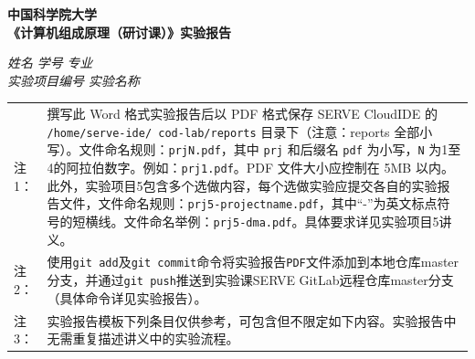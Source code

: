 \begin{center}
  \LARGE \bf 中国科学院大学 \\《计算机组成原理（研讨课）》实验报告
\end{center}

\begin{center}
  \emph{姓名} \underline{\makebox[7em][c]{\name}} 
  \emph{学号} \underline{\makebox[12em][c]{\studentNum}}
  \emph{专业} \underline{\makebox[15em][c]{\major}}\\
  \emph{实验项目编号} \underline{\makebox[3em][c]{\labNum}}
  \emph{实验名称} \underline{\makebox[30em][c]{\labName}}\\
\end{center}

\begin{center}
  \begin{tabularx}{\textwidth}{|lX|}
    \hline
    注1： & 撰写此 Word 格式实验报告后以 PDF 格式保存 SERVE CloudIDE 的 \texttt{/home/serve-ide/ cod-lab/reports} 目录下（注意：reports 全部小写）。文件命名规则：\texttt{prjN.pdf}，其中 \texttt{prj} 和后缀名 \texttt{pdf} 为小写，\texttt{N} 为1至4的阿拉伯数字。例如：\texttt{prj1.pdf}。PDF 文件大小应控制在 5MB 以内。此外，实验项目5包含多个选做内容，每个选做实验应提交各自的实验报告文件，文件命名规则：\texttt{prj5-projectname.pdf}，其中``-''为英文标点符号的短横线。文件命名举例：\texttt{prj5-dma.pdf}。具体要求详见实验项目5讲义。 \\

    注2： & 使用\texttt{git add}及\texttt{git commit}命令将实验报告\texttt{PDF}文件添加到本地仓库master分支，并通过\texttt{git push}推送到实验课SERVE GitLab远程仓库master分支（具体命令详见实验报告）。 \\

    注3： & 实验报告模板下列条目仅供参考，可包含但不限定如下内容。实验报告中无需重复描述讲义中的实验流程。\\
    \hline
  \end{tabularx}
\end{center}

  